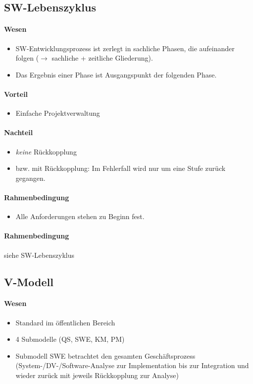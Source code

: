\subsection{SW-Lebenszyklus}
\paragraph{Wesen}
\begin{itemize}
\item SW-Entwicklungsprozess ist zerlegt in sachliche Phasen, die aufeinander folgen ($\to$ sachliche + zeitliche Gliederung).
\item Das Ergebnis einer Phase ist Ausgangspunkt der folgenden Phase.
\end{itemize}

\paragraph{Vorteil}
\begin{itemize}
\item Einfache Projektverwaltung 
\end{itemize}

\paragraph{Nachteil}
\begin{itemize}
\item \emph{keine} Rückkopplung
\item bzw. mit Rückkopplung: Im Fehlerfall wird nur um eine Stufe zurück gegangen.
\end{itemize}

\paragraph{Rahmenbedingung}
\begin{itemize}
\item Alle Anforderungen stehen zu Beginn fest.
\end{itemize}

\paragraph{Rahmenbedingung} siehe SW-Lebenszyklus

\subsection{V-Modell}
\paragraph{Wesen} 
\begin{itemize}
\item Standard im öffentlichen Bereich
\item 4 Submodelle (QS, SWE, KM, PM)
\item Submodell SWE betrachtet den gesamten Geschäftsprozess (System-/DV-/Software-Analyse zur Implementation bis zur Integration und wieder zurück mit jeweils Rückkopplung zur Analyse)
\end{itemize}


